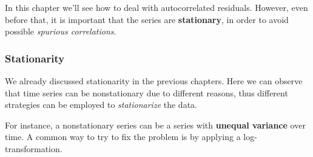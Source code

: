\documentclass[
]{article}
\newenvironment{Shaded}{\begin{snugshade}}{\end{snugshade}}
\newcommand{\AttributeTok}[1]{\textcolor[rgb]{0.13,0.29,0.53}{#1}}
\newcommand{\ConstantTok}[1]{\textcolor[rgb]{0.56,0.35,0.01}{#1}}
\newcommand{\DecValTok}[1]{\textcolor[rgb]{0.00,0.00,0.81}{#1}}
\newcommand{\FunctionTok}[1]{\textcolor[rgb]{0.13,0.29,0.53}{\textbf{#1}}}
\newcommand{\NormalTok}[1]{#1}
\newcommand{\OtherTok}[1]{\textcolor[rgb]{0.56,0.35,0.01}{#1}}
\newcommand{\SpecialCharTok}[1]{\textcolor[rgb]{0.81,0.36,0.00}{\textbf{#1}}}
\newcommand{\StringTok}[1]{\textcolor[rgb]{0.31,0.60,0.02}{#1}}
\begin{document}
In this chapter we'll see how to deal with autocorrelated residuals. However, even before that, it is important that the series are \textbf{stationary}, in order to avoid possible \emph{spurious correlations}.

\subsubsection{Stationarity}\label{stationarity}

We already discussed stationarity in the previous chapters. Here we can observe that time series can be nonstationary due to different reasons, thus different strategies can be employed to \emph{stationarize} the data.

For instance, a nonstationary series can be a series with \textbf{unequal variance} over time. A common way to try to fix the problem is by applying a log-transformation.

\begin{Shaded}
\end{Shaded}
\end{document}
